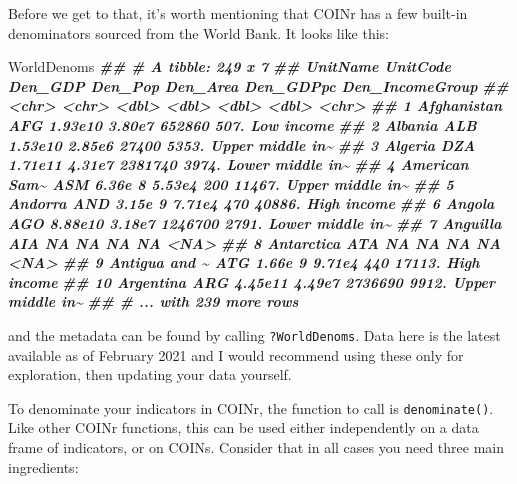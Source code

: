 \documentclass[
]{book}
\newenvironment{Shaded}{\begin{snugshade}}{\end{snugshade}}
\newcommand{\DocumentationTok}[1]{\textcolor[rgb]{0.56,0.35,0.01}{\textbf{\textit{#1}}}}
\newcommand{\NormalTok}[1]{#1}
\begin{document}
Before we get to that, it's worth mentioning that COINr has a few built-in denominators sourced from the World Bank. It looks like this:

\begin{Shaded}
\begin{Highlighting}[]
\NormalTok{WorldDenoms}
\DocumentationTok{\#\# \# A tibble: 249 x 7}
\DocumentationTok{\#\#    UnitName      UnitCode    Den\_GDP Den\_Pop Den\_Area Den\_GDPpc Den\_IncomeGroup }
\DocumentationTok{\#\#    \textless{}chr\textgreater{}         \textless{}chr\textgreater{}         \textless{}dbl\textgreater{}   \textless{}dbl\textgreater{}    \textless{}dbl\textgreater{}     \textless{}dbl\textgreater{} \textless{}chr\textgreater{}           }
\DocumentationTok{\#\#  1 Afghanistan   AFG         1.93e10  3.80e7   652860      507. Low income      }
\DocumentationTok{\#\#  2 Albania       ALB         1.53e10  2.85e6    27400     5353. Upper middle in\textasciitilde{}}
\DocumentationTok{\#\#  3 Algeria       DZA         1.71e11  4.31e7  2381740     3974. Lower middle in\textasciitilde{}}
\DocumentationTok{\#\#  4 American Sam\textasciitilde{} ASM         6.36e 8  5.53e4      200    11467. Upper middle in\textasciitilde{}}
\DocumentationTok{\#\#  5 Andorra       AND         3.15e 9  7.71e4      470    40886. High income     }
\DocumentationTok{\#\#  6 Angola        AGO         8.88e10  3.18e7  1246700     2791. Lower middle in\textasciitilde{}}
\DocumentationTok{\#\#  7 Anguilla      AIA        NA       NA            NA       NA  \textless{}NA\textgreater{}            }
\DocumentationTok{\#\#  8 Antarctica    ATA        NA       NA            NA       NA  \textless{}NA\textgreater{}            }
\DocumentationTok{\#\#  9 Antigua and \textasciitilde{} ATG         1.66e 9  9.71e4      440    17113. High income     }
\DocumentationTok{\#\# 10 Argentina     ARG         4.45e11  4.49e7  2736690     9912. Upper middle in\textasciitilde{}}
\DocumentationTok{\#\# \# ... with 239 more rows}
\end{Highlighting}
\end{Shaded}

and the metadata can be found by calling \texttt{?WorldDenoms}. Data here is the latest available as of February 2021 and I would recommend using these only for exploration, then updating your data yourself.

To denominate your indicators in COINr, the function to call is \texttt{denominate()}. Like other COINr functions, this can be used either independently on a data frame of indicators, or on COINs. Consider that in all cases you need three main ingredients:
\end{document}
